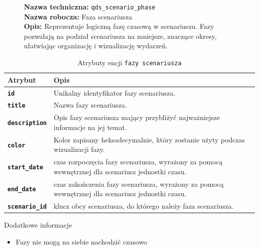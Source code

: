 \begin{figure}[H]
    \centering
    \begin{minipage}{0.8\textwidth} 
        \begin{framed}
            \noindent\textbf{\large Nazwa techniczna:} \texttt{qds\_scenario\_phase} \\
            \textbf{\large Nazwa robocza:} Faza scenariusza \\
            \textbf{\large Opis:} Reprezentuje logiczną fazę czasową w scenariuszu.
            Fazy pozwalają na podział scenariusza na mniejsze, znaczące okresy, ułatwiając organizację i wizualizację wydarzeń.
        \end{framed}
    \end{minipage}
\end{figure}

\begin{table}[H]
    \centering
    \renewcommand{\arraystretch}{1.6}
    \begin{tabular}{|>{\bfseries}l|p{}|}
        \hline
        \rowcolor[HTML]{EFEFEF} \textbf{Atrybut} & \textbf{Opis} \\
        \hline
        \texttt{id} & Unikalny identyfikator fazy scenariusza. \\
        \hline
        \texttt{title} & Nazwa fazy scenariusza. \\
        \hline
        \texttt{description} & Opis fazy scenariusza mający przybliżyć najważniejsze informacje na jej temat. \\
        \hline
        \texttt{color} & Kolor zapisany heksadecymalnie, który zostanie użyty podczas wizualizacji fazy. \\
        \hline
        \texttt{start\_date} & czas rozpoczęcia fazy scenariusza, wyrażony za pomocą wewnętrznej dla scenariusz jednostki czasu. \\
        \hline
        \texttt{end\_date} & czas zakończenia fazy scenariusza, wyrażony za pomocą wewnętrznej dla scenariusz jednostki czasu. \\
        \hline
        \texttt{scenario\_id} & klucz obcy scenariusza, do którego należy faza scenariusza. \\
        \hline
    \end{tabular}
    \caption{Atrybuty encji \texttt{fazy scenariusza}}
\end{table}

Dodatkowe informacje
\begin{itemize}
    \item Fazy nie mogą na siebie nachodzić czasowo
\end{itemize}


